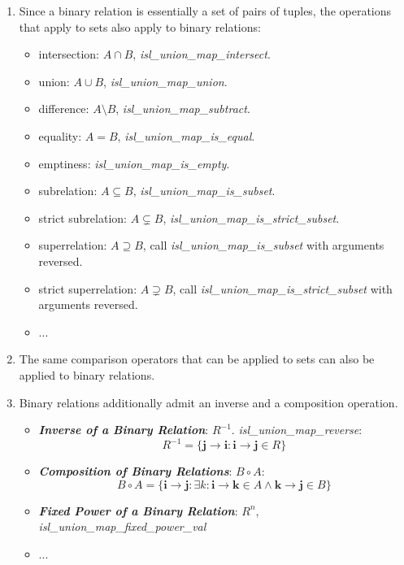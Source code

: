 \begin{enumerate}
  \item Since a binary relation is essentially a set of pairs of tuples, the operations that apply to sets also apply to binary relations:
  \begin{itemize}
    \item intersection: $A \cap B$, \textcolor{pg}{\emph{isl\_union\_map\_intersect}}.
    \item union: $A \cup B$, \textcolor{pg}{\emph{isl\_union\_map\_union}}.
    \item difference: ${A \setminus B}$, \textcolor{pg}{\emph{isl\_union\_map\_subtract}}.
    \item equality: ${A = B}$, \textcolor{pg}{\emph{isl\_union\_map\_is\_equal}}.
    \item emptiness: \textcolor{pg}{\emph{isl\_union\_map\_is\_empty}}.
    \item subrelation: $A \subseteq B$, \textcolor{pg}{\emph{isl\_union\_map\_is\_subset}}.
    \item strict subrelation: $A \subsetneq B$, \textcolor{pg}{\emph{isl\_union\_map\_is\_strict\_subset}}.
    \item superrelation: $A \supseteq B$, call \textcolor{pg}{\emph{isl\_union\_map\_is\_subset}} with arguments reversed.
    \item strict superrelation: $A \supsetneq B$, call \textcolor{pg}{\emph{isl\_union\_map\_is\_strict\_subset}} with arguments reversed.
    \item ...
  \end{itemize}

  \item The same comparison operators that can be applied to sets can also be applied to binary relations.

  \item Binary relations additionally admit an inverse and a composition operation.
  \begin{itemize}
    \item \textcolor{vr}{\textbf{\emph{Inverse of a Binary Relation}}}: $R^{-1}$. \textcolor{pg}{\emph{isl\_union\_map\_reverse}}:
    $$R^{-1} = \{\mathbf{j} \rightarrow \mathbf{i} : \mathbf{i} \rightarrow \mathbf{j} \in R \}$$

    \item \textcolor{vr}{\textbf{\emph{Composition of Binary Relations}}}: $B \circ A$:
    $$B \circ A = \{ \mathbf{i} \rightarrow \mathbf{j}:
    \exists k: \mathbf{i} \rightarrow \mathbf{k} \in A
    \wedge \mathbf{k} \rightarrow \mathbf{j} \in B \}$$
    \item \textcolor{vr}{\textbf{\emph{Fixed Power of a Binary Relation}}}: $R^n$, \textcolor{pg}{\emph{isl\_union\_map\_fixed\_power\_val}}
    \item ...
    \end{itemize}
\end{enumerate}

